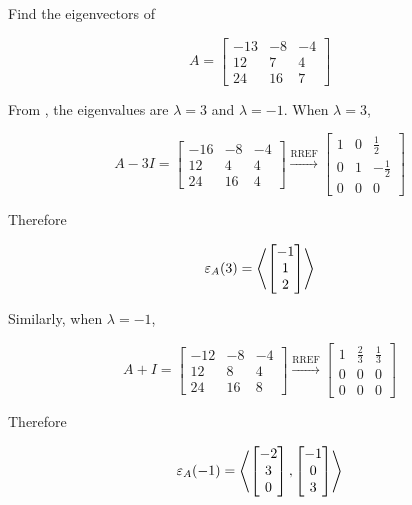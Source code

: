 \documentclass[a4paper,12pt]{article}
\begin{document}
\begin{exm}
  Find the eigenvectors of

  $$A=\begin{bmatrix}
    -13 & -8 & -4\\
    12 & 7 & 4\\
    24 & 16 & 7
  \end{bmatrix}$$\s

  \ans From \rexm[\sctd{3}], the eigenvalues are $\lambda=3$ and $\lambda=-1$. When $\lambda=3$,

  $$A-3I=\begin{bmatrix}
    -16 & -8 & -4\\
    12 & 4 & 4\\
    24 & 16 & 4
  \end{bmatrix}\xrightarrow[ ]{\text{RREF}}\begin{bmatrix}
    1 & 0 & \frac{1}{2}\\
    0 & 1 & -\frac{1}{2}\\
    0 & 0 & 0
  \end{bmatrix}$$\s

  Therefore

  $$\varepsilon_{A}(3)=\left\langle \begin{bmatrix}
    -1\\
    1\\
    2
  \end{bmatrix}\right\rangle$$\s

  Similarly, when $\lambda=-1$,

  $$A+I=\begin{bmatrix}
    -12 & -8 & -4\\
    12 & 8 & 4\\
    24 & 16 & 8
  \end{bmatrix}\xrightarrow[ ]{\text{RREF}}\begin{bmatrix}
    1 & \frac{2}{3} & \frac{1}{3}\\
    0 & 0 & 0\\
    0 & 0 & 0
  \end{bmatrix}$$\s

  Therefore

  $$\varepsilon_{A}(-1)=\left\langle \begin{bmatrix}
    -2\\
    3\\
    0
  \end{bmatrix},\begin{bmatrix}
    -1\\
    0\\
    3
  \end{bmatrix}\right\rangle$$\s
\end{exm}\n
\end{document}
